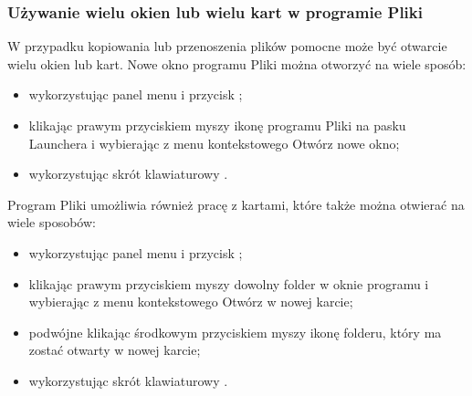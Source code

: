 \subsubsection{Używanie wielu okien lub wielu kart w programie Pliki}
W przypadku kopiowania lub przenoszenia plików pomocne może być otwarcie wielu okien lub kart. Nowe okno programu Pliki można otworzyć na wiele sposób:
\begin{itemize}
\item wykorzystując panel menu i przycisk ;
\item klikając prawym przyciskiem myszy ikonę programu Pliki na pasku Launchera i wybierając z menu kontekstowego \textcolor{ubuntu_orange}{Otwórz nowe okno};
\item wykorzystując skrót klawiaturowy .
\end{itemize}
Program Pliki umożliwia również pracę z kartami, które także można otwierać na wiele sposobów:
\begin{itemize}
\item wykorzystując panel menu i przycisk ;
\item klikając prawym przyciskiem myszy dowolny folder w oknie programu i wybierając z menu kontekstowego \textcolor{ubuntu_orange}{Otwórz w nowej karcie};
\item podwójne klikając środkowym przyciskiem myszy ikonę folderu, który ma zostać otwarty w nowej karcie;
\item wykorzystując skrót klawiaturowy .
\end{itemize}
